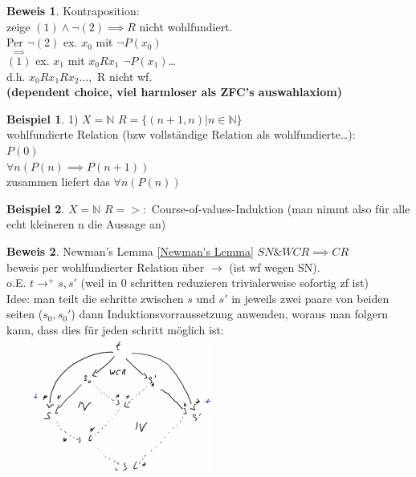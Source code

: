 \documentclass{article}
\theoremstyle{definition}
\newtheorem{beweis}{Beweis}[section]
\newtheorem{beispiel}{Beispiel}[section]
\begin{document}
	\begin{beweis} Kontraposition:\\
	zeige $(1)\land \lnot (2)\implies R$ nicht wohlfundiert.\\
	Per $\lnot(2)$ ex. $x_0$ mit $\lnot P(x_0)$\\
	$\stackrel{\implies}{(1)}$ ex. $x_1$ mit $x_0Rx_1$ $\lnot P(x_1)$\dots\\
	d.h. $x_0 Rx_1Rx_2\dots,$ R nicht wf.\\
	\textbf{(dependent choice, viel harmloser als ZFC's auswahlaxiom)}
	\end{beweis}
	\begin{beispiel} 1) $X=\mathbb{N}$ $R=\{(n+1,n)|n\in\mathbb{N}\}$\\
	wohlfundierte Relation (bzw vollständige Relation als wohlfundierte\dots):\\
	$P(0)$\\
	$\forall n(P(n)\implies P(n+1))$\\
	zusammen liefert das $\forall n (P(n))$\\
	\end{beispiel}
	\begin{beispiel} $X=\mathbb{N}$ $R= >:$ Course-of-values-Induktion (man nimmt also für alle echt kleineren n die Aussage an)
	\end{beispiel}
	\begin{beweis} Newman's Lemma \ref{Newman's Lemma} $SN \& WCR\implies CR$\\
	beweis per wohlfundierter Relation über $\to$ (ist wf wegen SN).\\
	o.E. $t\to^+ s,s'$ (weil in 0 schritten reduzieren trivialerweise sofortig zf ist)\\
	Idee: man teilt die schritte zwischen $s$ und $s'$ in jeweils zwei paare von beiden seiten ($s_0, s_0'$) dann Induktionsvorraussetzung anwenden, woraus man folgern kann, dass dies für jeden schritt möglich ist:\\
	\includegraphics[width=256px]{images/NewmansLemma.png}\\
	\end{beweis}
	\newpage
\end{document}
